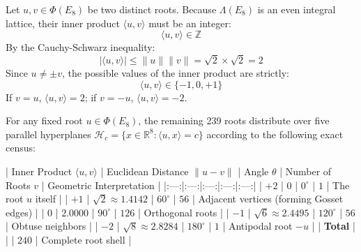 \documentclass[11pt,twoside,openright]{amsbook}
\begin{document}
Let $u, v \in \Phi(E_8)$ be two distinct roots. Because $\Lambda(E_8)$ is an even integral lattice, their inner product $\langle u, v \rangle$ must be an integer:
$$\langle u, v \rangle \in \mathbb{Z}$$
By the Cauchy-Schwarz inequality:
$$|\langle u, v \rangle| \le \|u\| \|v\| = \sqrt{2} \times \sqrt{2} = 2$$
Since $u \ne \pm v$, the possible values of the inner product are strictly:
$$\langle u, v \rangle \in \{-1, 0, +1\}$$
If $v = u$, $\langle u, v \rangle = 2$; if $v = -u$, $\langle u, v \rangle = -2$.

For any fixed root $u \in \Phi(E_8)$, the remaining 239 roots distribute over five parallel hyperplanes $\mathcal{H}_c = \{x \in \mathbb{R}^8 : \langle u, x \rangle = c\}$ according to the following exact census:

| Inner Product $\langle u, v \rangle$ | Euclidean Distance $\|u - v\|$ | Angle $\theta$ | Number of Roots $v$ | Geometric Interpretation |
|:---:|:---:|:---:|:---:|:---:|
| $+2$ | $0$ | $0^\circ$ | $1$ | The root $u$ itself |
| $+1$ | $\sqrt{2} \approx 1.4142$ | $60^\circ$ | \textbf{$56$} | Adjacent vertices (forming Gosset edges) |
| $0$ | $2.0000$ | $90^\circ$ | \textbf{$126$} | Orthogonal roots |
| $-1$ | $\sqrt{6} \approx 2.4495$ | $120^\circ$ | \textbf{$56$} | Obtuse neighbors |
| $-2$ | $\sqrt{8} \approx 2.8284$ | $180^\circ$ | $1$ | Antipodal root $-u$ |
| \textbf{Total} | | | \textbf{$240$} | Complete root shell |
\end{document}
